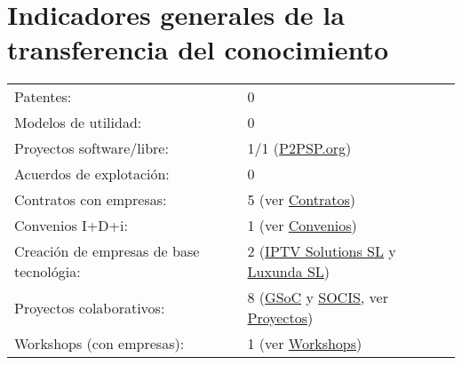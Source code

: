 \documentclass[a4paper]{article}
\begin{document}
\section*{Indicadores generales de la transferencia del conocimiento}
\begin{tabular}{ll}
Patentes: & 0 \\
Modelos de utilidad: & 0 \\
Proyectos software/libre: & 1/1 (\href{https://www.p2psp.org}{P2PSP.org}) \\
Acuerdos de explotación: & 0 \\
Contratos con empresas: & 5 (ver \hyperref[sec:contratos]{Contratos})\\
Convenios I+D+i: & 1 (ver \hyperref[sec:convenios]{Convenios}) \\
Creación de empresas de base tecnológia: & 2 (\href{http://www.infocif.es/ficha-empresa/iptv-solutions-sl}{IPTV Solutions SL} y \href{http://www.luxunda.es/}{Luxunda SL})\\
Proyectos colaborativos: & 8 (\href{https://summerofcode.withgoogle.com}{GSoC} y \href{https://www.esa.int/Our_Activities/Space_Engineering_Technology/SOCIS_The_ESA_Summer_of_Code_in_Space}{SOCIS}, ver \hyperref[sec:proyectos]{Proyectos}) \\
Workshops (con empresas): & 1 (ver \hyperref[sec:workshops]{Workshops})
\end{tabular}

%
\end{document}
